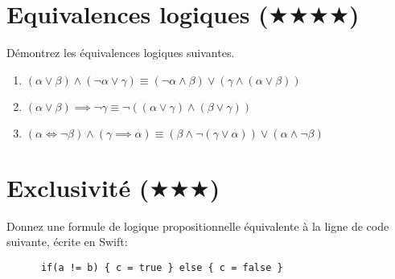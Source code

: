 \documentclass[a4paper, titlepage]{article}
\numberwithin{figure}{section}
\numberwithin{table}{section}
\begin{document}
  \section{Equivalences logiques ($\bigstar\bigstar\bigstar\bigstar$)}
    Démontrez les équivalences logiques suivantes.
    \begin{enumerate}
      \item $(\alpha \lor \beta) \land (\lnot\alpha \lor \gamma)
              \equiv (\lnot\alpha \land \beta) \lor (\gamma \land (\alpha \lor \beta))$
      \item $(\alpha \lor \beta) \implies \lnot\gamma
              \equiv \lnot((\alpha \lor \gamma) \land (\beta \lor \gamma))$
      \item $(\alpha \iff \lnot\beta) \land (\gamma \implies \alpha)
              \equiv (\beta \land \lnot(\gamma \lor \alpha)) \lor (\alpha \land \lnot\beta)$
    \end{enumerate}

  \section{Exclusivité ($\bigstar\bigstar\bigstar$)}
    Donnez une formule de logique propositionnelle équivalente à la ligne de code suivante,
    écrite en Swift:
    \begin{verbatim}
      if(a != b) { c = true } else { c = false }
    \end{verbatim}
\end{document}
